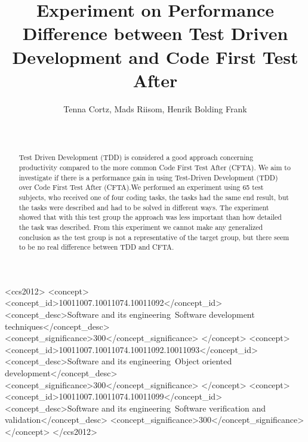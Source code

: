 \documentclass{sig-alternate-05-2015}
\begin{document}
	

\title{Experiment on Performance Difference between Test Driven Development and Code First Test After}

\author{
\alignauthor
Tenna Cortz, Mads Riisom, Henrik Bolding Frank\\
 \\
 \\
}


\maketitle
\begin{abstract}
Test Driven Development (TDD) is considered a good approach concerning productivity compared to the more common Code First Test After (CFTA). We aim to investigate if there is a performance gain in using Test-Driven Development (TDD) over Code First Test After (CFTA).We performed an experiment using 65 test subjects, who received one of four coding tasks, the tasks had the same end result, but the tasks were described and had to be solved in different ways.
The experiment showed that with this test group the approach was less important than how detailed the task was described.
From this experiment we cannot make any generalized conclusion as the test group is not a representative of the target group, but there seem to be no real difference between TDD and CFTA.

\end{abstract}

%
%
\begin{CCSXML}
<ccs2012>
<concept>
<concept_id>10011007.10011074.10011092</concept_id>
<concept_desc>Software and its engineering~Software development techniques</concept_desc>
<concept_significance>300</concept_significance>
</concept>
<concept>
<concept_id>10011007.10011074.10011092.10011093</concept_id>
<concept_desc>Software and its engineering~Object oriented development</concept_desc>
<concept_significance>300</concept_significance>
</concept>
<concept>
<concept_id>10011007.10011074.10011099</concept_id>
<concept_desc>Software and its engineering~Software verification and validation</concept_desc>
<concept_significance>300</concept_significance>
</concept>
</ccs2012>
\end{CCSXML}
\end{document}
